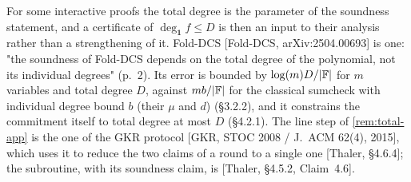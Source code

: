 \begin{remark}\label{rem:total-prior}
For some interactive proofs the total degree is the parameter of the soundness statement, and a
certificate of $\deg_{\mathbf 1}f\le D$ is then an input to their analysis rather than a
strengthening of it. Fold-DCS [Fold-DCS, arXiv:2504.00693] is one: "the soundness of Fold-DCS
depends on the total degree of the polynomial, not its individual degrees" (p.~2). Its error is
bounded by $\log(m)D/|\mathbb{F}|$ for $m$ variables and total degree $D$, against $mb/|\mathbb{F}|$ for the
classical sumcheck with individual degree bound $b$ (their $\mu$ and $d$) (\S3.2.2), and it constrains the commitment itself
to total degree at most $D$ (\S4.2.1). The line step of \cref{rem:total-app} is the one of the GKR
protocol [GKR, STOC 2008 / J.~ACM 62(4), 2015], which uses it to reduce the two claims of a round to
a single one [Thaler, \S4.6.4]; the subroutine, with its soundness claim, is
[Thaler, \S4.5.2, Claim~4.6].
\end{remark}
